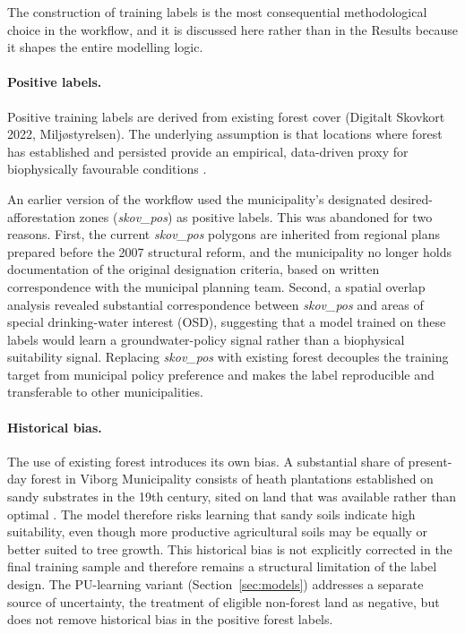\documentclass[land,article,submit,moreauthors]{Definitions/mdpi}
\begin{document}
The construction of training labels is the most consequential methodological choice in the workflow, and it is discussed here rather than in the Results because it shapes the entire modelling logic.

\paragraph{Positive labels.}
Positive training labels are derived from existing forest cover (Digitalt Skovkort 2022, Milj{\o}styrelsen). The underlying assumption is that locations where forest has established and persisted provide an empirical, data-driven proxy for biophysically favourable conditions \citep{chen2019,buthelezi2024review}.

An earlier version of the workflow used the municipality's designated desired-afforestation zones (\textit{skov\_pos}) as positive labels. This was abandoned for two reasons. First, the current \textit{skov\_pos} polygons are inherited from regional plans prepared before the 2007 structural reform, and the municipality no longer holds documentation of the original designation criteria, based on written correspondence with the municipal planning team. Second, a spatial overlap analysis revealed substantial correspondence between \textit{skov\_pos} and areas of special drinking-water interest (OSD), suggesting that a model trained on these labels would learn a groundwater-policy signal rather than a biophysical suitability signal. Replacing \textit{skov\_pos} with existing forest decouples the training target from municipal policy preference and makes the label reproducible and transferable to other municipalities.

\paragraph{Historical bias.}
The use of existing forest introduces its own bias. A substantial share of present-day forest in Viborg Municipality consists of heath plantations established on sandy substrates in the 19th century, sited on land that was available rather than optimal \citep{sorensen2024}. The model therefore risks learning that sandy soils indicate high suitability, even though more productive agricultural soils may be equally or better suited to tree growth. This historical bias is not explicitly corrected in the final training sample and therefore remains a structural limitation of the label design. The PU-learning variant (Section~\ref{sec:models}) addresses a separate source of uncertainty, the treatment of eligible non-forest land as negative, but does not remove historical bias in the positive forest labels.
\end{document}
